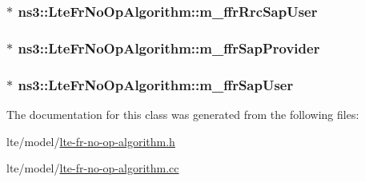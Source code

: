 \subsubsection[{\texorpdfstring{m\+\_\+ffr\+Rrc\+Sap\+User}{m_ffrRrcSapUser}}]{$\ast$ ns3\+::\+Lte\+Fr\+No\+Op\+Algorithm\+::m\+\_\+ffr\+Rrc\+Sap\+User\hspace{0.3cm}{\ttfamily [private]}}\hypertarget{classns3_1_1LteFrNoOpAlgorithm_a11f64887579f035d97b0d2bde9f5499c}{}\label{classns3_1_1LteFrNoOpAlgorithm_a11f64887579f035d97b0d2bde9f5499c}
\subsubsection[{\texorpdfstring{m\+\_\+ffr\+Sap\+Provider}{m_ffrSapProvider}}]{$\ast$ ns3\+::\+Lte\+Fr\+No\+Op\+Algorithm\+::m\+\_\+ffr\+Sap\+Provider\hspace{0.3cm}{\ttfamily [private]}}\hypertarget{classns3_1_1LteFrNoOpAlgorithm_a088d792e6df4a86c44c7de816902b7e0}{}\label{classns3_1_1LteFrNoOpAlgorithm_a088d792e6df4a86c44c7de816902b7e0}
\subsubsection[{\texorpdfstring{m\+\_\+ffr\+Sap\+User}{m_ffrSapUser}}]{$\ast$ ns3\+::\+Lte\+Fr\+No\+Op\+Algorithm\+::m\+\_\+ffr\+Sap\+User\hspace{0.3cm}{\ttfamily [private]}}\hypertarget{classns3_1_1LteFrNoOpAlgorithm_aef5463abfede443a5a1f0aa0bc623e11}{}\label{classns3_1_1LteFrNoOpAlgorithm_aef5463abfede443a5a1f0aa0bc623e11}


The documentation for this class was generated from the following files\+:\begin{DoxyCompactItemize}
\item 
lte/model/\hyperlink{lte-fr-no-op-algorithm_8h}{lte-\/fr-\/no-\/op-\/algorithm.\+h}\item 
lte/model/\hyperlink{lte-fr-no-op-algorithm_8cc}{lte-\/fr-\/no-\/op-\/algorithm.\+cc}\end{DoxyCompactItemize}
